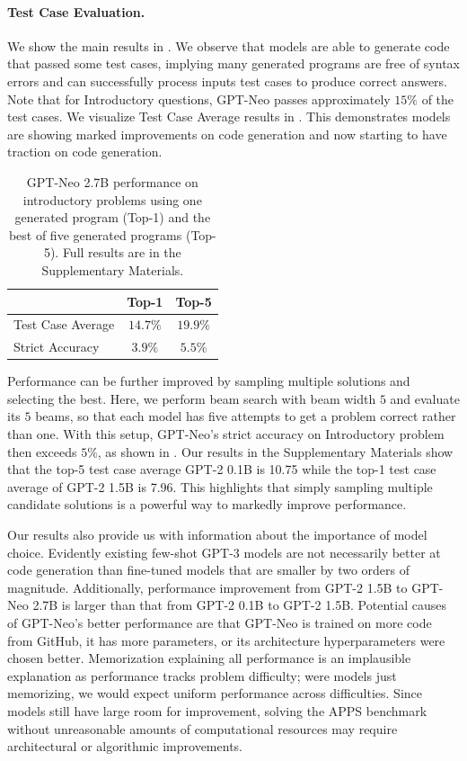 \paragraph{Test Case Evaluation.}
We show the main results in . We observe that models are able to generate code that passed some test cases, implying many generated programs are free of syntax errors and can successfully process inputs test cases to produce correct answers. Note that for Introductory questions, GPT-Neo passes approximately $15\%$ of the test cases. We visualize Test Case Average results in . This demonstrates models are showing marked improvements on code generation and now starting to have traction on code generation.

\begin{table}
\begin{center}
\begin{tabular}{l|cc}
    & Top-1 & Top-5 \\ \midrule
Test Case Average & $14.7\%$ & $19.9\%$ \\
Strict Accuracy & $3.9\%$ & $5.5\%$ \\
\bottomrule
\end{tabular}
\caption{GPT-Neo 2.7B performance on introductory problems using one generated program (Top-1) and the best of five generated programs (Top-5). Full results are in the Supplementary Materials. %
}
\label{tab:topk}
\end{center}
\end{table}

Performance can be further improved by sampling multiple solutions and selecting the best. Here, we perform beam search with beam width $5$ and evaluate its $5$ beams, so that each model has five attempts to get a problem correct rather than one. With this setup, GPT-Neo's strict accuracy on Introductory problem then exceeds $5\%$, as shown in . Our results in the Supplementary Materials show that the top-5 test case average GPT-2 0.1B is 10.75 while the top-1 test case average of GPT-2 1.5B is 7.96. This highlights that simply sampling multiple candidate solutions is a powerful way to markedly improve performance.

Our results also provide us with information about the importance of model choice. Evidently existing few-shot GPT-3 models are not necessarily better at code generation than fine-tuned models that are smaller by two orders of magnitude. Additionally, performance improvement from GPT-2 1.5B to GPT-Neo 2.7B is larger than that from GPT-2 0.1B to GPT-2 1.5B. Potential causes of GPT-Neo's better performance are that GPT-Neo is trained on more code from GitHub, it has more parameters, or its architecture hyperparameters were chosen better. Memorization explaining all performance is an implausible explanation as performance tracks problem difficulty; were models just memorizing, we would expect uniform performance across difficulties. Since models still have large room for improvement, solving the APPS benchmark without unreasonable amounts of computational resources may require architectural or algorithmic improvements.

